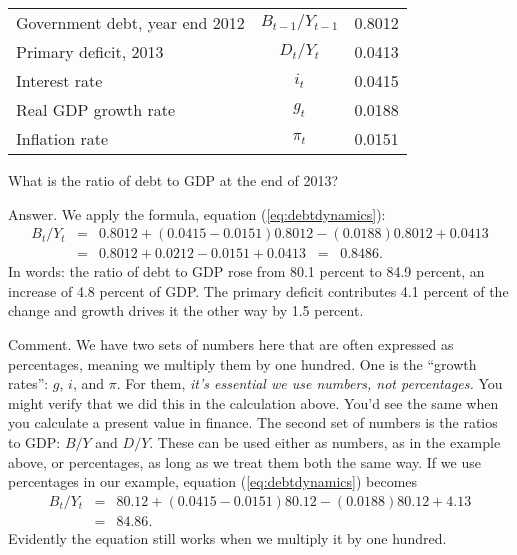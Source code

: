 \begin{center}
\begin{tabular}{lcr}
\toprule
%
Government debt, year end 2012  &  $B_{t-1}/Y_{t-1}$ & 0.8012 \\
Primary deficit, 2013           &  $D_t/Y_t$         & 0.0413 \\
Interest rate                   &  $i_t$             & 0.0415 \\
Real GDP growth rate            &  $g_t$             & 0.0188 \\
Inflation rate                  &  $\pi_t$           & 0.0151 \\
\bottomrule
\end{tabular}
\end{center}

What is the ratio of debt to GDP at the end of 2013?

Answer.  We apply the formula, equation (\ref{eq:debtdynamics}):
\begin{eqnarray*}
    {B_{t}}/{Y_{t}} &=&  0.8012  + (0.0415-0.0151) 0.8012 - (0.0188) 0.8012 + 0.0413 \\
            &=&  0.8012 + 0.0212 - 0.0151 + 0.0413 \;\;=\;\; 0.8486.
\end{eqnarray*}
In words:  the ratio of debt to GDP rose from 80.1 percent to 84.9 percent,
an increase of 4.8 percent of GDP.
The primary deficit contributes 4.1 percent of the change
and growth drives it the other way by 1.5 percent.

Comment.  We have two sets of numbers here that are often expressed
as percentages, meaning we multiply them by one hundred.
One is the ``growth rates'':  $g$, $i$, and $\pi$.
For them, {\it it's essential we use numbers, not percentages.\/}
You might verify that we did this in the calculation above.
You'd see the same when you calculate a present value in finance.
The second set of numbers is the ratios to GDP:  $B/Y$ and $D/Y$.
These can be used either as numbers, as in the example above, or percentages,
as long as we treat them both the same way.
If we use percentages in our example,
equation (\ref{eq:debtdynamics}) becomes
\begin{eqnarray*}
    {B_{t}}/{Y_{t}} &=&  80.12  + (0.0415-0.0151) 80.12 - (0.0188) 80.12 + 4.13 \\
            &=&  84.86. 
\end{eqnarray*}
Evidently the equation still works when we multiply it by one hundred.



